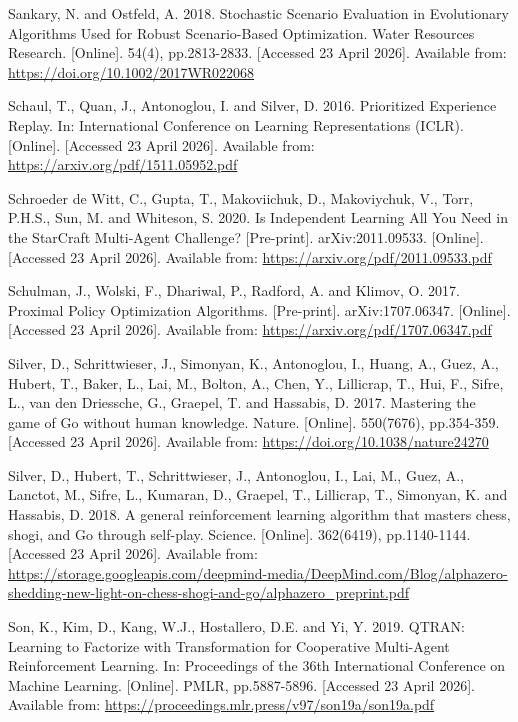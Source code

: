 Sankary, N. and Ostfeld, A. 2018. Stochastic Scenario Evaluation in Evolutionary Algorithms Used for Robust Scenario-Based Optimization. Water Resources Research. [Online]. 54(4), pp.2813-2833. [Accessed 23 April 2026]. Available from: \url{https://doi.org/10.1002/2017WR022068}

Schaul, T., Quan, J., Antonoglou, I. and Silver, D. 2016. Prioritized Experience Replay. In: International Conference on Learning Representations (ICLR). [Online]. [Accessed 23 April 2026]. Available from: \url{https://arxiv.org/pdf/1511.05952.pdf}

Schroeder de Witt, C., Gupta, T., Makoviichuk, D., Makoviychuk, V., Torr, P.H.S., Sun, M. and Whiteson, S. 2020. Is Independent Learning All You Need in the {StarCraft} Multi-Agent Challenge? [Pre-print]. arXiv:2011.09533. [Online]. [Accessed 23 April 2026]. Available from: \url{https://arxiv.org/pdf/2011.09533.pdf}

Schulman, J., Wolski, F., Dhariwal, P., Radford, A. and Klimov, O. 2017. Proximal Policy Optimization Algorithms. [Pre-print]. arXiv:1707.06347. [Online]. [Accessed 23 April 2026]. Available from: \url{https://arxiv.org/pdf/1707.06347.pdf}

Silver, D., Schrittwieser, J., Simonyan, K., Antonoglou, I., Huang, A., Guez, A., Hubert, T., Baker, L., Lai, M., Bolton, A., Chen, Y., Lillicrap, T., Hui, F., Sifre, L., van den Driessche, G., Graepel, T. and Hassabis, D. 2017. Mastering the game of {Go} without human knowledge. Nature. [Online]. 550(7676), pp.354-359. [Accessed 23 April 2026]. Available from: \url{https://doi.org/10.1038/nature24270}

Silver, D., Hubert, T., Schrittwieser, J., Antonoglou, I., Lai, M., Guez, A., Lanctot, M., Sifre, L., Kumaran, D., Graepel, T., Lillicrap, T., Simonyan, K. and Hassabis, D. 2018. A general reinforcement learning algorithm that masters chess, shogi, and {Go} through self-play. Science. [Online]. 362(6419), pp.1140-1144. [Accessed 23 April 2026]. Available from: \url{https://storage.googleapis.com/deepmind-media/DeepMind.com/Blog/alphazero-shedding-new-light-on-chess-shogi-and-go/alphazero_preprint.pdf}

Son, K., Kim, D., Kang, W.J., Hostallero, D.E. and Yi, Y. 2019. {QTRAN}: Learning to Factorize with Transformation for Cooperative Multi-Agent Reinforcement Learning. In: Proceedings of the 36th International Conference on Machine Learning. [Online]. PMLR, pp.5887-5896. [Accessed 23 April 2026]. Available from: \url{https://proceedings.mlr.press/v97/son19a/son19a.pdf}

